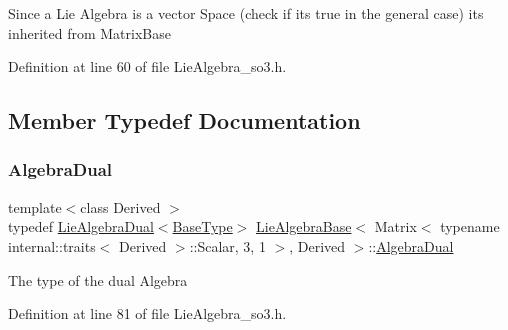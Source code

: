 Since a Lie Algebra is a vector Space (check if it\textquotesingle{}s true in the general case) it\textquotesingle{}s inherited from Matrix\+Base 

Definition at line 60 of file Lie\+Algebra\+\_\+so3.\+h.



\subsection{Member Typedef Documentation}
\hypertarget{class_lie_algebra_base_3_01_matrix_3_01typename_01internal_1_1traits_3_01_derived_01_4_1_1_scalabfa0bdce6d9781ee940346c3f6d91f4e_abe2ee13078cb63c23731c4b3af7b02cd}{}\label{class_lie_algebra_base_3_01_matrix_3_01typename_01internal_1_1traits_3_01_derived_01_4_1_1_scalabfa0bdce6d9781ee940346c3f6d91f4e_abe2ee13078cb63c23731c4b3af7b02cd} 
\subsubsection{\texorpdfstring{Algebra\+Dual}{AlgebraDual}}
{\footnotesize\ttfamily template$<$class Derived $>$ \\
typedef \hyperlink{class_lie_algebra_dual}{Lie\+Algebra\+Dual}$<$\hyperlink{class_lie_algebra_base_3_01_matrix_3_01typename_01internal_1_1traits_3_01_derived_01_4_1_1_scalabfa0bdce6d9781ee940346c3f6d91f4e_a2191d421225a2c966825db324301abba}{Base\+Type}$>$ \hyperlink{class_lie_algebra_base}{Lie\+Algebra\+Base}$<$ Matrix$<$ typename internal\+::traits$<$ Derived $>$\+::Scalar, 3, 1 $>$, Derived $>$\+::\hyperlink{class_lie_algebra_base_3_01_matrix_3_01typename_01internal_1_1traits_3_01_derived_01_4_1_1_scalabfa0bdce6d9781ee940346c3f6d91f4e_abe2ee13078cb63c23731c4b3af7b02cd}{Algebra\+Dual}}

The type of the dual Algebra 

Definition at line 81 of file Lie\+Algebra\+\_\+so3.\+h.

\hypertarget{class_lie_algebra_base_3_01_matrix_3_01typename_01internal_1_1traits_3_01_derived_01_4_1_1_scalabfa0bdce6d9781ee940346c3f6d91f4e_a732476e0ccd5638bf791f9f7a4c59f26}{}\label{class_lie_algebra_base_3_01_matrix_3_01typename_01internal_1_1traits_3_01_derived_01_4_1_1_scalabfa0bdce6d9781ee940346c3f6d91f4e_a732476e0ccd5638bf791f9f7a4c59f26} 
